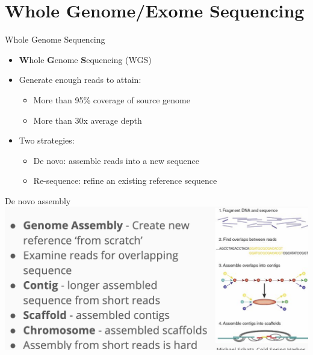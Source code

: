 \documentclass[
  ignorenonframetext,
]{beamer}
\providecommand{\tightlist}{%
  \setlength{\itemsep}{0pt}\setlength{\parskip}{0pt}}
\begin{document}
\section{Whole Genome/Exome
Sequencing}\label{whole-genomeexome-sequencing}

\begin{frame}{Whole Genome Sequencing}
\label{whole-genome-sequencing}
\Large

\begin{itemize}
\tightlist
\item
  \textbf{W}hole \textbf{G}enome \textbf{S}equencing (WGS)
\item
  Generate enough reads to attain:

  \begin{itemize}
  \tightlist
  \item
    More than 95\% coverage of source genome
  \item
    More than 30x average depth
  \end{itemize}
\item
  Two strategies:

  \begin{itemize}
  \tightlist
  \item
    De novo: assemble reads into a new sequence
  \item
    Re-sequence: refine an existing reference sequence
  \end{itemize}
\end{itemize}
\end{frame}

\begin{frame}{De novo assembly}
\label{de-novo-assembly}
\includegraphics{figs/denovo.png}
\end{frame}
\end{document}
